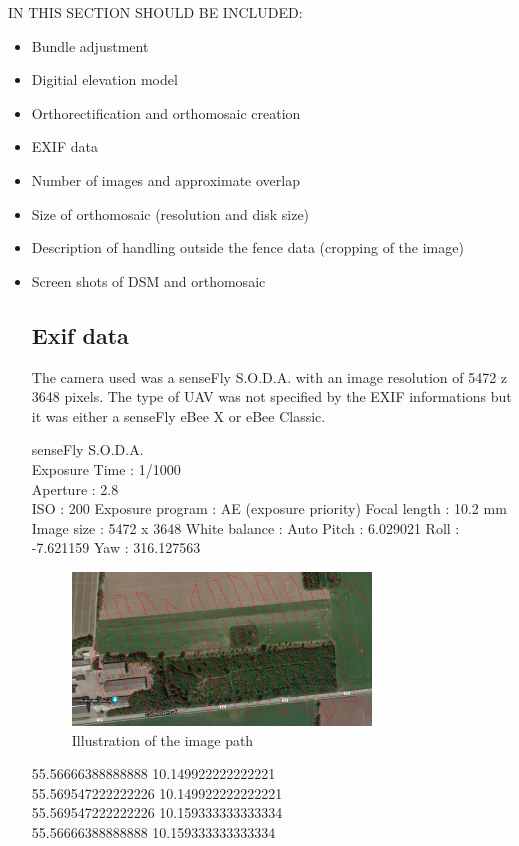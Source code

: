 \documentclass[../Head/Main.tex]{subfiles}
\begin{document}
IN THIS SECTION SHOULD BE INCLUDED:
\begin{itemize}
\item Bundle adjustment
\item Digitial elevation model
\item Orthorectification and orthomosaic creation
\item EXIF data
\item Number of images and approximate overlap
\item Size of orthomosaic (resolution and disk size)
\item Description of handling outside the fence data (cropping of the image)
\item Screen shots of DSM and orthomosaic

\subsection{Exif data}
The camera used was a senseFly S.O.D.A. with an image resolution of 5472 z 3648 pixels. The type of UAV was not specified by the EXIF informations but it was either a senseFly eBee X or eBee Classic.


senseFly S.O.D.A.\\
Exposure Time : 1/1000\\
Aperture      : 2.8\\
ISO           : 200
Exposure program : AE (exposure priority)
Focal length  : 10.2 mm
Image size    : 5472 x 3648
White balance : Auto
Pitch                           : 6.029021
Roll                            : -7.621159
Yaw                             : 316.127563



\begin{figure}[H]
	\centering
	\includegraphics[width=0.75\textwidth]{../Figures/Flight_path}
	\caption{Illustration of the image path}
	\label{fig:flight_path}
\end{figure}

55.56666388888888 10.149922222222221\\
55.569547222222226 10.149922222222221\\
55.569547222222226 10.159333333333334\\
55.56666388888888 10.159333333333334\\

\end{itemize}
\end{document}
